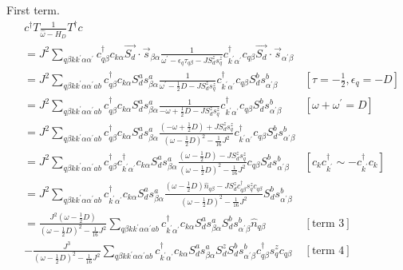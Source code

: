 \documentclass[12pt]{article}
\begin{document}
First term.
\begin{equation}\begin{aligned}
	&c^\dagger T \frac{1}{\hat \omega - H_D}T^\dagger c \\
	&= J^2\sum_{q\beta k k^\prime \alpha \alpha^\prime} c^\dagger_{q\beta} c_{k\alpha} \vec{S_d}\cdot\vec{s}_{\beta \alpha} \frac{1}{\omega^\prime - \epsilon_q\tau_{q\beta} - J S_d^z s_q^z}c^\dagger_{k^\prime\alpha^\prime} c_{q\beta} \vec{S_d}\cdot\vec{s}_{\alpha^\prime \beta}\\
	&= J^2\sum_{q\beta k k^\prime \alpha \alpha^\prime a b} c^\dagger_{q\beta} c_{k\alpha} S_d^a s^a_{\beta \alpha} \frac{1}{\omega^\prime - \frac{1}{2}D - J S_d^z s_q^z}c^\dagger_{k^\prime\alpha^\prime} c_{q\beta} S_d^b s^b_{\alpha^\prime \beta} & \left[\tau = -\frac{1}{2},\epsilon_q = -D\right] \\
	&= J^2\sum_{q\beta k k^\prime \alpha \alpha^\prime a b} c^\dagger_{q\beta} c_{k\alpha} S_d^a s^a_{\beta \alpha} \frac{1}{-\omega + \frac{1}{2}D - J S_d^z s_q^z}c^\dagger_{k^\prime\alpha^\prime} c_{q\beta} S_d^b s^b_{\alpha^\prime \beta} & \left[\omega + \omega^\prime = D\right] \\
							   &= J^2\sum_{q\beta k k^\prime \alpha \alpha^\prime a b} c^\dagger_{q\beta} c_{k\alpha} S_d^a s^a_{\beta \alpha} \frac{\left(-\omega + \frac{1}{2}D\right) + J S_d^z s_q^z}{\left(\omega - \frac{1}{2}D\right)^2 - \frac{1}{16}J^2}c^\dagger_{k^\prime\alpha^\prime} c_{q\beta} S_d^b s^b_{\alpha^\prime \beta}\\
							   &= J^2\sum_{q\beta k k^\prime \alpha \alpha^\prime a b} c^\dagger_{q\beta} c^\dagger_{k^\prime\alpha^\prime}c_{k\alpha} S_d^a s^a_{\beta \alpha} \frac{\left(\omega - \frac{1}{2}D\right) - J S_d^z s_q^z}{\left(\omega - \frac{1}{2}D\right)^2 - \frac{1}{16}J^2} c_{q\beta} S_d^b s^b_{\alpha^\prime \beta} & \left[c_k c^\dagger_{k^\prime} \sim - c^\dagger_{k^\prime}c_k\right] \\
							   &= J^2\sum_{q\beta k k^\prime \alpha \alpha^\prime a b} c^\dagger_{k^\prime\alpha^\prime}c_{k\alpha} S_d^a s^a_{\beta \alpha} \frac{\left(\omega - \frac{1}{2}D\right) \hat n_{q\beta} - J S_d^z  c^\dagger_{q\beta}s_q^z c_{q\beta}}{\left(\omega - \frac{1}{2}D\right)^2 - \frac{1}{16}J^2} S_d^b s^b_{\alpha^\prime \beta} \\
							   &= \frac{J^2\left(\omega - \frac{1}{2}D\right)}{\left(\omega - \frac{1}{2}D\right)^2 - \frac{1}{16}J^2}\sum_{q\beta k k^\prime \alpha \alpha^\prime a b} c^\dagger_{k^\prime\alpha^\prime}c_{k\alpha} S_d^a s^a_{\beta \alpha} S_d^b s^b_{\alpha^\prime \beta}\hat n_{q\beta} & \left[\text{term 3}\right] \\
							   &- \frac{J^3}{\left(\omega - \frac{1}{2}D\right)^2 - \frac{1}{16}J^2} \sum_{q\beta k k^\prime \alpha \alpha^\prime a b} c^\dagger_{k^\prime\alpha^\prime}c_{k\alpha} S_d^a s^a_{\beta \alpha} S_d^z S_d^b s^b_{\alpha^\prime \beta} c^\dagger_{q\beta}s_q^z c_{q\beta} & \left[\text{term 4}\right] \\
\end{aligned}\end{equation}
\end{document}
